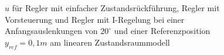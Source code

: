 \documentclass[
	pagesize,
	fontsize=12pt,
	paper=a4,
	oneside,
   reqno
]{scrartcl}
\begin{document}
\begin{figure}[H]
    \centering
    \caption[Reglervergleich für $u$ (linear)]{$u$ für Regler mit einfacher Zustandsrückführung, Regler mit Vorsteuerung und Regler mit I-Regelung bei einer Anfangsauslenkungen von $20^\circ$ und einer Referenzposition $y_{ref} = 0,1 m$ am linearen Zustandsraummodell}
    \label{fig:Bild20.3}
\end{figure}
\end{document}
